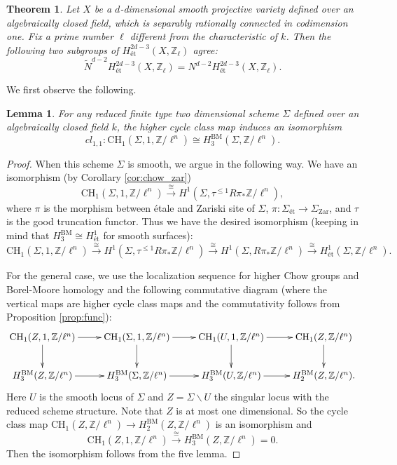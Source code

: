 \documentclass{amsart}
\newtheorem{thm}[theorem]{Theorem}
\newtheorem{lem}[theorem]{Lemma}
\theoremstyle{definition}
\theoremstyle{remark}
\newcommand{\mbb}{\mathbb}
\newcommand{\ZZ}{\mbb{Z}}
\newcommand{\et}{\text{\'et}}
\begin{document}
\begin{thm}\label{thm:image_sheaf}
Let $X$ be a $d$-dimensional smooth projective variety defined over an algebraically closed field, which is separably rationally connected in codimension one. Fix a prime number $\ell$ different from the characteristic of $k$. 
Then the following two subgroups of $H^{2d-3}_{\et}(X, \ZZ_\ell)$ agree:
\[
\tilde{N}^{d-2}H_{\et}^{2d-3}(X, \ZZ_\ell)=N^{d-2}H^{2d-3}_\et(X, \ZZ_\ell).
\]
\end{thm}
We first observe the following.
\begin{lem}\label{lem:surface_CH_1_1}
    For any reduced finite type two dimensional scheme $\Sigma$ defined over an algebraically closed field $k$, the higher cycle class map induces an isomorphism
\[
cl_{1, 1}: \text{CH}_1(\Sigma, 1, \ZZ/{\ell^n}) \cong H_3^{\text{BM}}(\Sigma, \ZZ/\ell^n).
\]
\end{lem}
\begin{proof}
    When this scheme $\Sigma$ is smooth, we argue in the following way. We have an isomorphism (by Corollary \ref{cor:chow_zar})
\[
\text{CH}_1(\Sigma, 1, \ZZ/\ell^n) \xrightarrow{\cong} H^1(\Sigma, \tau^{\leq 1}R\pi_* \ZZ/\ell^n),
\]
where $\pi$ is the morphism between \'etale and Zariski site of $\Sigma$, $\pi: \Sigma_{\et}\to \Sigma_{\text{Zar}}$, and $\tau$ is the good truncation functor.
Thus we have the desired isomorphism
(keeping in mind that $H_3^{\text{BM}}\cong H^1_\et$ for smooth surfaces):
\[
\text{CH}_1(\Sigma, 1, \ZZ/\ell^n) \xrightarrow{\cong} H^1(\Sigma, \tau^{\leq 1}R\pi_* \ZZ/\ell^n) \xrightarrow{\cong} H^1(\Sigma, R\pi_* \ZZ/\ell^n)\xrightarrow{\cong} H^1_\et(\Sigma, \ZZ/\ell^n).
\]

For the general case, we use the localization sequence for higher Chow groups and Borel-Moore homology and the following commutative diagram (where the vertical maps are higher cycle class maps and the commutativity follows from Proposition \ref{prop:func}):
\[
\xymatrix{
\text{CH}_1(Z, 1, \ZZ/\ell^n) \ar[r] \ar[d] &\text{CH}_1(\Sigma, 1, \ZZ/\ell^n) \ar[r] \ar[d] &\text{CH}_1(U, 1, \ZZ/\ell^n) \ar[r] \ar[d]&\text{CH}_1(Z, \ZZ/\ell^n) \ar[d]\\   
    H_3^{\text{BM}}(Z, \ZZ/\ell^n) \ar[r]  &H_3^{\text{BM}}(\Sigma, \ZZ/\ell^n) \ar[r] &H_3^{\text{BM}}(U, \ZZ/\ell^n) \ar[r] &H_2^{\text{BM}}(Z, \ZZ/\ell^n).}
\]
Here $U$ is the smooth locus of $\Sigma$ and $Z=\Sigma\backslash U$ the singular locus with the reduced scheme structure. Note that $Z$ is at most one dimensional. So the cycle class map $\text{CH}_1(Z, \ZZ/\ell^n) \to H_2^{\text{BM}}(Z, \ZZ/\ell^n)$ is an isomorphism and 
\[
\text{CH}_1(Z, 1, \ZZ/\ell^n)\xrightarrow{\cong} H_3^{\text{BM}}(Z, \ZZ/\ell^n)=0.
\]
Then the isomorphism follows from the five lemma.
\end{proof}
\end{document}

